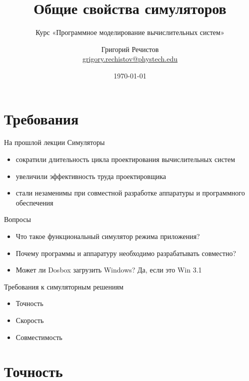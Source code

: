 \documentclass{beamer}
\title{Общие свойства симуляторов}
\subtitle{Курс «Программное моделирование вычислительных систем»}
\author[]{Григорий Речистов \\ \small{\href{mailto:grigory.rechistov@phystech.edu}{grigory.rechistov@phystech.edu}}}
\date{\today}
\begin{document}
\begin{frame}
    \maketitle
\end{frame}

\begin{frame}
    \tableofcontents
\end{frame}

\section{Требования}

\begin{frame}{На прошлой лекции}
Симуляторы
\begin{itemize}
\item сократили длительность цикла проектирования вычислительных систем
\item увеличили эффективность труда проектировщика
\item стали незаменимы при совместной разработке аппаратуры и программного обеспечения
\end{itemize}
\end{frame}

\begin{frame}{Вопросы}
\begin{itemize}
\item Что такое функциональный симулятор режима приложения?\pause 
\item Почему программы и аппаратуру необходимо разрабатывать совместно?\pause
\item Может ли Dosbox загрузить Windows? \pause Да, если это Win 3.1
\end{itemize}
\end{frame}


\begin{frame}{Требования к симуляторным решениям}
\begin{itemize}
\item Точность
\item Скорость
\item Совместимость
\end{itemize}
\end{frame}

\section{Точность}
\end{document}
